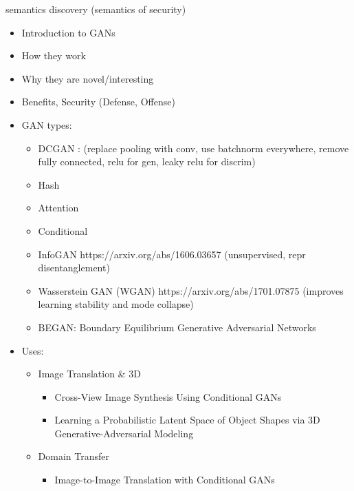 \documentclass[11pt]{article}
\begin{document}
semantics discovery (semantics of security)



\begin{itemize}
    \item Introduction to GANs \cite{NIPS2014_5423} \\ %
    \item How they work\\
    \item Why they are novel/interesting\\
    \item Benefits, Security (Defense, Offense)\\

    \item GAN types: %
    \begin{itemize}
        \item DCGAN \cite{DBLP:journals/corr/RadfordMC15}: (replace pooling with conv, use batchnorm everywhere, remove fully connected, relu for gen, leaky relu for discrim) %
        \item Hash
        \item Attention
        \item Conditional \cite{mirza2014conditional}\\
        \item InfoGAN https://arxiv.org/abs/1606.03657 (unsupervised, repr disentanglement)
        \item Wasserstein GAN (WGAN) https://arxiv.org/abs/1701.07875 (improves learning stability and mode collapse)
        \item BEGAN: Boundary Equilibrium Generative Adversarial Networks
    \end{itemize}

    \item Uses: 
    \begin{itemize}
        \item Image Translation \& 3D
        \begin{itemize}
            \item Cross-View Image Synthesis Using Conditional GANs \cite{regmi2018crossview}
            \item Learning a Probabilistic Latent Space of Object Shapes via 3D Generative-Adversarial Modeling \cite{NIPS2016_6096}
        \end{itemize}
        
        \item Domain Transfer
        \begin{itemize}
            \item Image-to-Image Translation with Conditional GANs \cite{isola2017image}
        \end{itemize}
        

\end{itemize}
\end{itemize}
\end{document}
